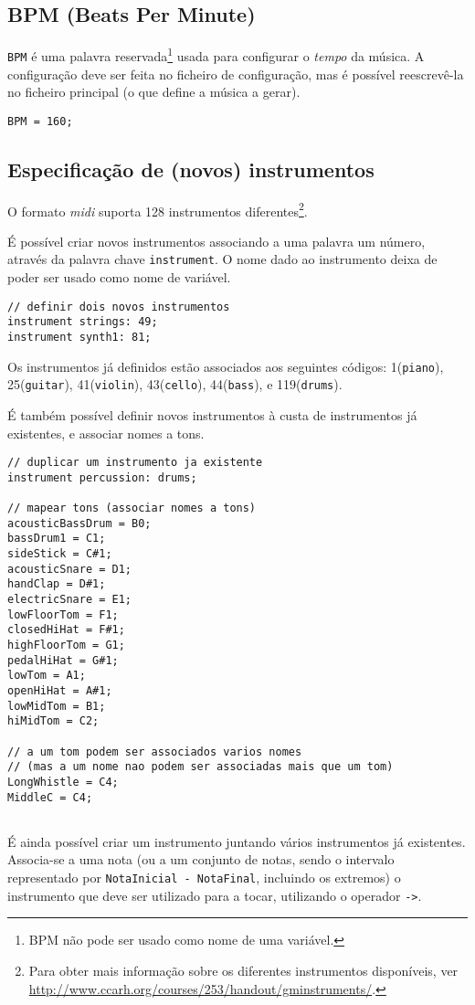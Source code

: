 \documentclass{article}
\begin{document}
\subsection{BPM (Beats Per Minute)}
\texttt{BPM} é uma palavra reservada\footnote{BPM não pode ser usado como nome de uma variável.} usada para configurar o \textit{tempo} da música. A configuração deve ser feita no ficheiro de configuração, mas é possível reescrevê-la no ficheiro principal (o que define a música a gerar).
\begin{lstlisting} 
BPM = 160;
\end{lstlisting}

\subsection{Especificação de (novos) instrumentos}
O formato \textit{midi} suporta 128 instrumentos diferentes\footnote{Para obter mais informação sobre os diferentes instrumentos disponíveis, ver \url{http://www.ccarh.org/courses/253/handout/gminstruments/}.}.

É possível criar novos instrumentos associando a uma palavra um número, através da palavra chave \texttt{instrument}. O nome dado ao instrumento deixa de poder ser usado como nome de variável.

\begin{lstlisting} 
// definir dois novos instrumentos
instrument strings: 49;
instrument synth1: 81;
\end{lstlisting}

Os instrumentos já definidos estão associados aos seguintes códigos: 1(\texttt{piano}), 25(\texttt{guitar}), 41(\texttt{violin}), 43(\texttt{cello}), 44(\texttt{bass}), e 119(\texttt{drums}). 

É também possível definir novos instrumentos à custa de instrumentos já existentes, e associar nomes a tons.

\begin{lstlisting} 
// duplicar um instrumento ja existente
instrument percussion: drums;

// mapear tons (associar nomes a tons)
acousticBassDrum = B0;
bassDrum1 = C1;
sideStick = C#1;
acousticSnare = D1;
handClap = D#1;
electricSnare = E1;
lowFloorTom = F1;
closedHiHat = F#1;
highFloorTom = G1;
pedalHiHat = G#1;
lowTom = A1;
openHiHat = A#1;
lowMidTom = B1;
hiMidTom = C2;

// a um tom podem ser associados varios nomes
// (mas a um nome nao podem ser associadas mais que um tom)
LongWhistle = C4;
MiddleC = C4;
                     	 
\end{lstlisting}	 
É ainda possível criar um instrumento juntando vários instrumentos já existentes. Associa-se a uma nota (ou a um conjunto de notas, sendo o intervalo representado por \texttt{NotaInicial - NotaFinal}, incluindo os extremos) o instrumento que deve ser utilizado para a tocar, utilizando o operador \texttt{->}.
\end{document}
